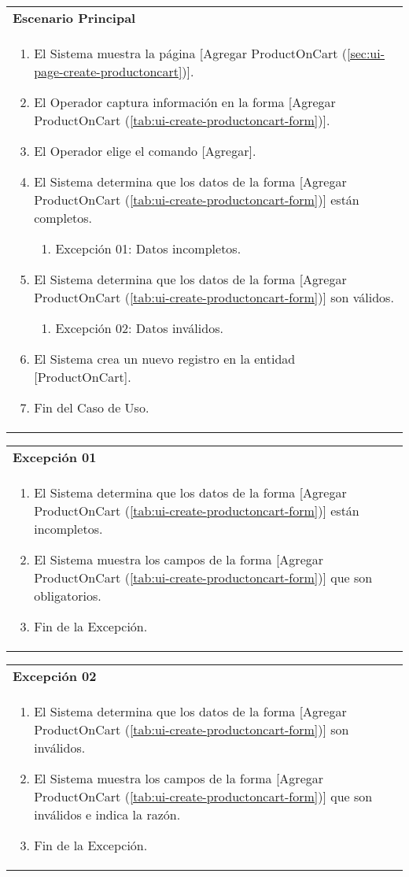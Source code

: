 	\begin{tabular}{ p{15.5cm} }
		\textbf{Escenario Principal} \\
		\begin{enumerate}
			\item El Sistema muestra la p\'agina [Agregar ProductOnCart (\ref{sec:ui-page-create-productoncart})].
			\item El Operador captura informaci\'on en la forma [Agregar ProductOnCart (\ref{tab:ui-create-productoncart-form})].
			\item El Operador elige el comando [Agregar].
			\item El Sistema determina que los datos de la forma [Agregar ProductOnCart (\ref{tab:ui-create-productoncart-form})] est\'an completos.
				\begin{enumerate}
					\item Excepci\'on 01: Datos incompletos.
				\end{enumerate}
			\item El Sistema determina que los datos de la forma [Agregar ProductOnCart (\ref{tab:ui-create-productoncart-form})] son v\'alidos.
				\begin{enumerate}
					\item Excepci\'on 02: Datos inv\'alidos.
				\end{enumerate}
			\item El Sistema crea un nuevo registro en la entidad [ProductOnCart].
			\item Fin del Caso de Uso.
		\end{enumerate}
	\end{tabular}
	
	\begin{tabular}{ p{15.5cm} }
		\textbf{Excepci\'on 01} \\
		\begin{enumerate}
			\item El Sistema determina que los datos de la forma [Agregar ProductOnCart (\ref{tab:ui-create-productoncart-form})] est\'an incompletos.
			\item El Sistema muestra los campos de la forma [Agregar ProductOnCart (\ref{tab:ui-create-productoncart-form})] que son obligatorios.
			\item Fin de la Excepci\'on.
		\end{enumerate}
	\end{tabular}
	
	\begin{tabular}{ p{15.5cm} }
		\textbf{Excepci\'on 02} \\
		\begin{enumerate}
			\item El Sistema determina que los datos de la forma [Agregar ProductOnCart (\ref{tab:ui-create-productoncart-form})] son inv\'alidos.
			\item El Sistema muestra los campos de la forma [Agregar ProductOnCart (\ref{tab:ui-create-productoncart-form})] que son inv\'alidos e indica la raz\'on.
			\item Fin de la Excepci\'on.
		\end{enumerate}
	\end{tabular}
	
